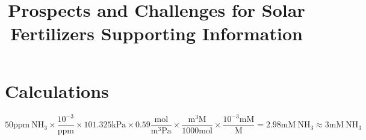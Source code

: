 \documentclass[journal=jacsat,manuscript=article]{achemso}
\title{Prospects and Challenges for Solar Fertilizers Supporting Information}
\begin{document}
\renewcommand{\thepage}{S\arabic{page}}
\renewcommand{\theequation}{S\arabic{equation}}
\renewcommand{\thetable}{S\arabic{table}}
\renewcommand{\thefigure}{S\arabic{figure}}
\newpage
{}
\listoftables
\listoffigures
\newpage

\section{Calculations}
\begin{equation}
\mathrm{
50ppm \: NH_3 \times \frac{10^{-3}}{ppm} \times 101.325kPa \times 0.59 \frac{mol}{m^3Pa} \times \frac{m^3M}{1000mol} \times \frac{10^{-3} mM}{M} = 2.98mM \: NH_3 \approx 3mM \: NH_3
}
\end{equation}



\pagebreak

\end{document}
